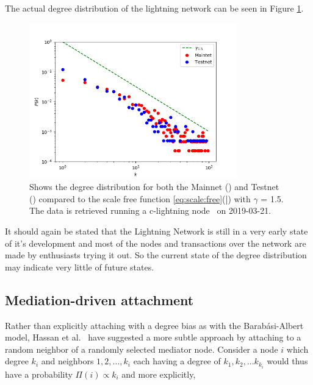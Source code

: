 
The actual degree distribution of the lightning network can be seen in Figure \ref{fig:real_network}.

\begin{figure}[!htb]
	\hspace*{-0.5cm} 
	\centering
	\includegraphics[width=9cm]{images/main-testnet_degree_distribution.png}
	\caption{Shows the degree distribution for both the Mainnet (\tikzcircle[red, fill=red]{2pt}) and Testnet (\tikzcircle[blue, fill=blue]{2pt})
		compared to the scale free function \ref{eq:scale:free}(\textcolor{black}{|}) with $\gamma$ = 1.5. The data is retrieved running a c-lightning node~\cite{repository:clightning} on 2019-03-21.
	}
	\label{fig:real_network}
	\hspace*{2mm} 
\end{figure}

It should again be stated that the Lightning Network is still in a very early state of it's development and most of the nodes and transactions over the network are made by enthusiasts trying it out. So the current state of the degree distribution may indicate very little of future states. 

\subsection{Mediation-driven attachment}

Rather than explicitly attaching with a degree bias as with the Barabási-Albert model, Hassan et al.~\cite{hassan:islam:haque:mediation} have suggested a more subtle approach by attaching to a random neighbor of a randomly selected mediator node. Consider a node $i$ which degree $k_i$ and neighbors $1,2,...,k_i$ each having a degree of $k_1, k_2, ... k_{k_i}$ would thus have a probability $\Pi(i) \propto k_i$ and more explicitly,

